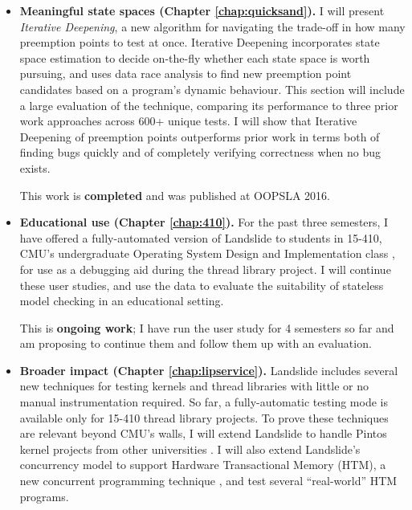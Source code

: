\documentclass[12pt]{cmuthesis}
\begin{document}
\begin{itemize}
	\item {\bf Meaningful state spaces (Chapter \ref{chap:quicksand}).}
		I will present {\em Iterative Deepening}, a new algorithm for navigating the trade-off in how many preemption points to test at once.
		Iterative Deepening incorporates state space estimation \cite{estimation} to decide on-the-fly whether each state space is worth pursuing, and uses data race analysis \cite{tsan} to find new preemption point candidates based on a program's dynamic behaviour.
		This section will include a large evaluation of the technique, comparing its performance to three prior work approaches across 600+ unique tests.
		I will show that Iterative Deepening of preemption points outperforms prior work in terms both of finding bugs quickly and of completely verifying correctness when no bug exists.

		This work is {\bf completed} and was published at OOPSLA 2016.
	\item {\bf Educational use (Chapter \ref{chap:410}).}
		For the past three semesters, I have offered a fully-automated version of Landslide to students in 15-410, CMU's undergraduate Operating System Design and Implementation class \cite{kspec,thrlib}, for use as a debugging aid during the thread library project.
		I will continue these user studies, and use the data to evaluate the suitability of stateless model checking in an educational setting.

		This is {\bf ongoing work}; I have run the user study for 4 semesters so far and am proposing to continue them and follow them up with an evaluation.
	\item {\bf Broader impact (Chapter \ref{chap:lipservice}).}
		Landslide includes several new techniques for testing kernels and thread libraries with little or no manual instrumentation required.
		So far, a fully-automatic testing mode is available only for 15-410 thread library projects.
		To prove these techniques are relevant beyond CMU's walls, I will extend Landslide to handle Pintos kernel projects from other universities \cite{pintos}. %
		I will also extend Landslide's concurrency model to support Hardware Transactional Memory (HTM), a new concurrent programming technique \cite{transactional-memory}, and test several ``real-world'' HTM programs.


\end{itemize}
\end{document}

